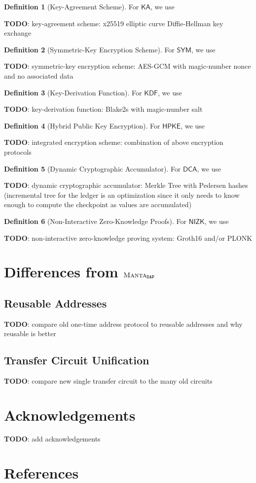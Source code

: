 \documentclass[a4paper]{article}
\newcommand{\lsection}[2]{\def\sectionlabel{#2} \section{#1}\label{sec:#2}}
\newcommand{\TODO}[1]{{\color{red}\textbf{TODO}}: #1}
\theoremstyle{definition}
\newtheorem{definition}{Definition}[subsection]
\newcommand{\DCA}{{\textsf{DCA}}}
\newcommand{\HPKE}{{\textsf{HPKE}}}
\newcommand{\KA}{{\textsf{KA}}}
\newcommand{\KDF}{{\textsf{KDF}}}
\newcommand{\MantaDAP}{{\Manta{}_{\texttt{DAP}}}}
\newcommand{\Manta}{{\textsc{Manta}}}
\newcommand{\NIZK}{{\textsf{NIZK}}}
\newcommand{\SYM}{{\textsf{SYM}}}
\newcommand{\Transfer}{{\textsf{Transfer}}}
\begin{document}
\begin{definition}[Key-Agreement Scheme]
    For $\KA$, we use

    \TODO{key-agreement scheme: x25519 elliptic curve Diffie-Hellman key exchange}
\end{definition}

\begin{definition}[Symmetric-Key Encryption Scheme]
    For $\SYM$, we use

    \TODO{symmetric-key encryption scheme: AES-GCM with magic-number nonce and no associated data}
\end{definition}

\begin{definition}[Key-Derivation Function]
    For $\KDF$, we use

    \TODO{key-derivation function: Blake2s with magic-number salt}
\end{definition}

\begin{definition}[Hybrid Public Key Encryption]
    For $\HPKE$, we use

    \TODO{integrated encryption scheme: combination of above encryption protocols}
\end{definition}

\begin{definition}[Dynamic Cryptographic Accumulator]
    For $\DCA$, we use

    \TODO{dynamic cryptographic accumulator: Merkle Tree with Pedersen hashes (incremental tree for the ledger is an optimization since it only needs to know enough to compute the checkpoint as values are accumulated)}
\end{definition}

\begin{definition}[Non-Interactive Zero-Knowledge Proofs]
    For $\NIZK$, we use

    \TODO{non-interactive zero-knowledge proving system: Groth16 and/or PLONK}
\end{definition}

\lsection{Differences from $\MantaDAP$}{differences}

\subsection{Reusable Addresses}

\TODO{compare old one-time address protocol to reusable addresses and why reusable is better}

\subsection{\Transfer{} Circuit Unification}

\TODO{compare new single transfer circuit to the many old circuits}

\lsection{Acknowledgements}{acknowledgements}

\TODO{add acknowledgements}

\lsection{References}{references}


\end{document}
